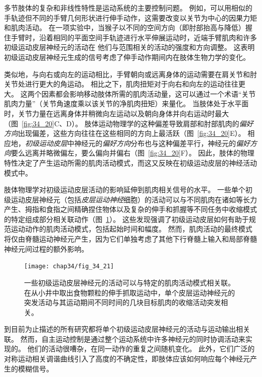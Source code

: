 多节肢体的复杂和非线性特性是运动系统的主要控制问题。
例如，可以用相似的手轨迹但不同的手臂几何形状进行伸手动作，这需要改变以关节为中心的因果力矩和肌肉活动。
在一项实验中，当猴子以不同的空间方向（即肘部抬高与降低）握住手臂时，沿着相同的平面空间手轨迹进行水平伸展运动时，近端手臂肌肉和许多初级运动皮层神经元的活动在 他们与范围相关的活动的强度和方向调整。
这表明初级运动皮层神经元生成的信号考虑了伸手动作期间内在肢体生物力学的变化。


类似地，与向右或向左的运动相比，手臂朝向或远离身体的运动需要在肩关节和肘关节处进行更大的角运动。
相比之下，肌肉扭矩对于向右和向左的运动往往更大。
这两个因素都会影响移动肢体所需的肌肉活动量，这可以通过一个术语“关节肌肉力量”（关节角速度乘以该关节的净肌肉扭矩）来量化。
当肢体处于水平面时，关节力量在远离身体并稍微向左运动以及朝向身体并向右运动时最大（图~\ref{fig:34_20}C、D）。
肢体运动物理学的这种偏差导致肩部和肘部肌肉的\textit{偏好方向}出现偏差，这些方向往往在这些相同的方向上最活跃（图~\ref{fig:34_20}E）。
相应地，\textit{初级运动皮层}中神经元的\textit{偏好方向}分布也与这种偏差平行，神经元的\textit{偏好方向}要么远离并略微偏左，要么偏向并偏右（图~\ref{fig:34_20}F）。
因此，肢体的物理特性决定了产生运动所需的肌肉活动模式，而这又反映在初级运动皮层的神经活动模式中。


肢体物理学对初级运动皮层活动的影响延伸到肌肉相关信号的水平。
一些单个初级运动皮层神经元（包括\textit{皮层运动神经}细胞）的活动可以与不同肌肉在诸如等长力产生、拇指和食指之间精确捏住物体以及复杂的伸手和抓握等不同任务中收缩模式的特定组成部分相关联动作（图~\ref{fig:34_21}）。
这些发现强调了初级运动皮层如何有助于规范运动动作的肌肉活动模式，包括起始时间和幅度。
然而，肌肉活动的最终模式将仅由脊髓运动神经元产生，因为它们单独考虑了其他下行脊髓上输入和局部脊髓神经元间过程的额外影响。


\begin{figure}[htbp]
	\centering
	\texttt{[image: chap34/fig\_34\_21]}
	\caption{一些初级运动皮层神经元的活动可以与特定的肌肉活动模式相关联。
		在从小井中取出食物颗粒的伸手抓取运动中，单个皮层运动神经元的突发活动与其运动期间不同时间的几块目标肌肉的收缩活动突发相关\cite{griffin2008corticomotoneuronal}。}
	\label{fig:34_21}
\end{figure}


到目前为止描述的所有研究都将单个初级运动皮层神经元的活动与运动输出相关联。
然而，自主运动控制是通过整个运动系统中许多神经元的同时协调活动来实现的。
他们的活动很嘈杂，在同一动作的重复之间随机变化。
此外，它们广泛的对称运动相关调谐曲线引入了高度的不确定性，即肢体应该如何响应每个神经元产生的模糊信号。


